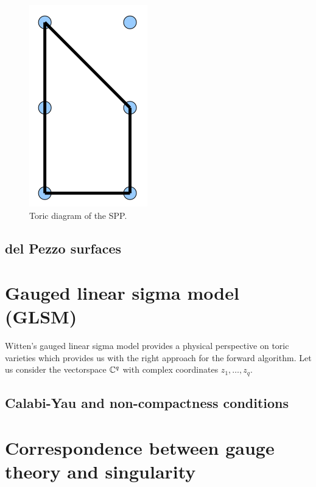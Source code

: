        \begin{figure}
           \centering
           \includegraphics[scale=0.4]{Pictures/SPPtoricdiagram.png}
           \caption{Toric diagram of the SPP.}
       \end{figure}

    \subsection{del Pezzo surfaces}

\section{Gauged linear sigma model (GLSM)}

    Witten's gauged linear sigma model provides a physical perspective on toric varieties which provides us with the right approach for the forward algorithm. Let us consider the vectorspace $\mathbb{C}^q$ with complex coordinates $z_1,\dots,z_q$.
        

    \subsection{Calabi-Yau and non-compactness conditions}

\section{Correspondence between gauge theory and singularity}

